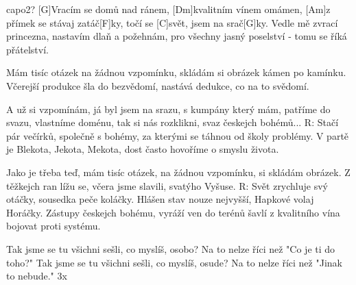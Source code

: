 \hfill capo2?
[G]Vracím se domů nad ránem, [Dm]kvalitním vínem omámen,
[Am]z přímek se stávaj zatáč[F]ky, točí se [C]svět, jsem na srač[G]ky.
Vedle mě zvrací princezna, nastavím dlaň a požehnám,
pro všechny jasný poselství - tomu se říká přátelství.

Mám tisíc otázek na žádnou vzpomínku,
skládám si obrázek kámen po kamínku.
Včerejší produkce šla do bezvědomí,
nastává dedukce, co na to svědomí.

A už si vzpomínám, já byl jsem na srazu,
s kumpány který mám, patříme do svazu,
vlastníme doménu, tak si nás rozklikni,
svaz českejch bohémů...
R:
Stačí pár večírků, společně s bohémy,
za kterými se táhnou od školy problémy.
V partě je Blekota, Jekota, Mekota,
dost často hovoříme o smyslu života.

Jako je třeba teď, mám tisíc otázek,
na žádnou vzpomínku, si skládám obrázek.
Z těžkejch ran lížu se, včera jsme slavili,
svatýho Vyšuse.
R:
Svět zrychluje svý otáčky, sousedka peče koláčky.
Hlášen stav nouze nejvyšší, Hapkové volaj Horáčky.
Zástupy českejch bohému, vyráží ven do terénů
šavlí z kvalitního vína bojovat proti systému.

Tak jsme se tu všichni sešli, co myslíš, osobo?
Na to nelze říci než "Co je ti do toho?"
Tak jsme se tu všichni sešli, co myslíš, osude?
Na to nelze říci než "Jinak to nebude." 3x